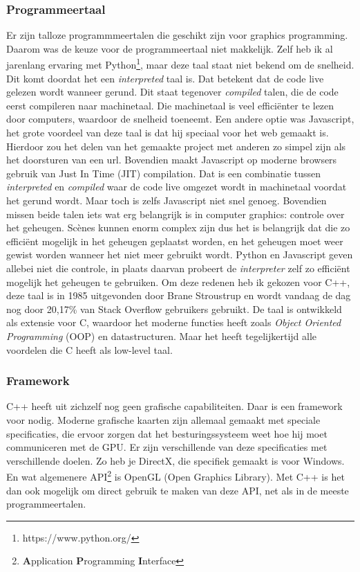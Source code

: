\documentclass[12pt, a4paper]{article}
\begin{document}
\subsubsection{Programmeertaal}
Er zijn talloze programmmeertalen die geschikt zijn voor graphics programming. Daarom was de keuze voor de programmeertaal niet makkelijk. Zelf heb ik al jarenlang ervaring met Python\footnote{https://www.python.org/}, maar deze taal staat niet bekend om de snelheid. Dit komt doordat het een \emph{interpreted} taal is. Dat betekent dat de code live gelezen wordt wanneer gerund. Dit staat tegenover \emph{compiled} talen, die de code eerst compileren naar machinetaal. Die machinetaal is veel efficiënter te lezen door computers, waardoor de snelheid toeneemt. Een andere optie was Javascript, het grote voordeel van deze taal is dat hij speciaal voor het web gemaakt is. Hierdoor zou het delen van het gemaakte project met anderen zo simpel zijn als het doorsturen van een url. Bovendien maakt Javascript op moderne browsers gebruik van Just In Time (JIT) compilation. Dat is een combinatie tussen \emph{interpreted} en \emph{compiled} waar de code live omgezet wordt in machinetaal voordat het gerund wordt. Maar toch is zelfs Javascript niet snel genoeg. Bovendien missen beide talen iets wat erg belangrijk is in computer graphics: controle over het geheugen. Scènes kunnen enorm complex zijn dus het is belangrijk dat die zo efficiënt mogelijk in het geheugen geplaatst worden, en het geheugen moet weer gewist worden wanneer het niet meer gebruikt wordt. Python en Javascript geven allebei niet die controle, in plaats daarvan probeert de \emph{interpreter} zelf zo efficiënt mogelijk het geheugen te gebruiken. Om deze redenen heb ik gekozen voor C++, deze taal is in 1985 uitgevonden door Brane Stroustrup en wordt vandaag de dag nog door 20,17\% van Stack Overflow gebruikers gebruikt\cite{StackOverflowSurvey}. De taal is ontwikkeld als extensie voor C, waardoor het moderne functies heeft zoals \emph{Object Oriented Programming} (OOP) en datastructuren. Maar het heeft tegelijkertijd alle voordelen die C heeft als low-level taal. 
\subsubsection{Framework}
C++ heeft uit zichzelf nog geen grafische capabiliteiten. Daar is een framework voor nodig. Moderne grafische kaarten zijn allemaal gemaakt met speciale specificaties, die ervoor zorgen dat het besturingssysteem weet hoe hij moet communiceren met de GPU. Er zijn verschillende van deze specificaties met verschillende doelen. Zo heb je DirectX, die specifiek gemaakt is voor Windows. En wat algemenere API\footnote{\textbf{A}pplication \textbf{P}rogramming \textbf{I}nterface} is OpenGL (Open Graphics Library). Met C++ is het dan ook mogelijk om direct gebruik te maken van deze API, net als in de meeste programmeertalen. 
\end{document}
